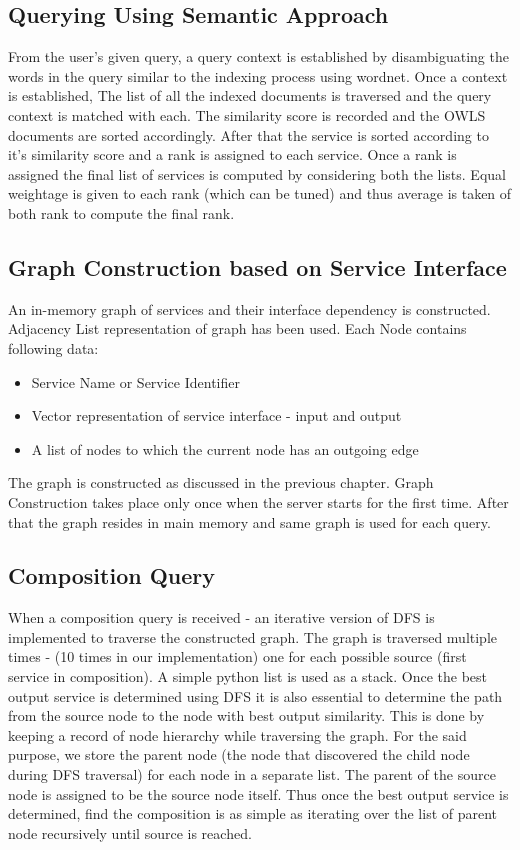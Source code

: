 \documentclass[12pt, oneside]{book}
\begin{document}
\subsection{Querying Using Semantic Approach}
From the user's given query, a query context is established by disambiguating the words in the query similar to the indexing process using wordnet. Once a context is established, The list of all the indexed documents is traversed and the query context is matched with each. The similarity score is recorded and the OWLS documents are sorted accordingly. After that the service is sorted according to it's similarity score and a rank is assigned to each service. Once a rank is assigned the final list of services is computed by considering both the lists. Equal weightage is given to each rank (which can be tuned) and thus average is taken of both rank to compute the final rank.

\subsection{Graph Construction based on Service Interface}
An in-memory graph of services and their interface dependency is constructed. Adjacency List representation of graph has been used. Each Node contains following data:
\begin{itemize}
 \item Service Name or Service Identifier
 \item Vector representation of service interface - input and output
 \item A list of nodes to which the current node has an outgoing edge
\end{itemize}
The graph is constructed as discussed in the previous chapter. Graph Construction takes place only once when the server starts for the first time. After that the graph resides in main memory and same graph is used for each query.

\subsection{Composition Query}
When a composition query is received - an iterative version of DFS is implemented to traverse the constructed graph. The graph is traversed multiple times - (10 times in our implementation) one for each possible source (first service in composition). A simple python list is used as a stack. Once the best output service is determined using DFS it is also essential to determine the path from the source node to the node with best output similarity. This is done by keeping a record of node hierarchy while traversing the graph. For the said purpose, we store the parent node (the node that discovered the child node during DFS traversal) for each node in a separate list. The parent of the source node is assigned to be the source node itself. Thus once the best output service is determined, find the composition is as simple as iterating over the list of parent node recursively until source is reached.
\end{document}
